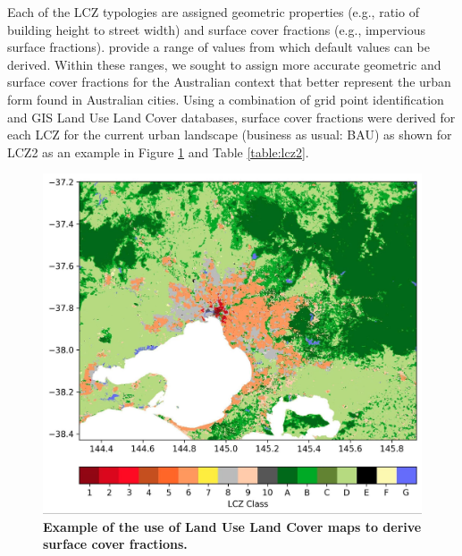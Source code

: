 \documentclass[utf8]{frontiersSCNS} %
\begin{document}
Each of the LCZ typologies are assigned geometric properties (e.g., ratio of building height to street width) and surface cover fractions (e.g., impervious surface fractions). \cite{Stewart2012b} provide a range of values from which default values can be derived. Within these ranges, we sought to assign more accurate geometric and surface cover fractions for the Australian context that better represent the urban form found in Australian cities. Using a combination of grid point identification and GIS Land Use Land Cover databases, surface cover fractions were derived for each LCZ for the current urban landscape (business as usual: BAU) as shown for LCZ2 as an example in Figure \ref{fig:surfCovFrac} and Table \ref{table:lcz2}.

\begin{figure}
\centering
\includegraphics[trim={0 0 0 0},clip,scale=0.15]{images/image5.jpg}
\caption{\bf Example of the use of Land Use Land Cover maps to derive surface cover fractions.}
 \label{fig:surfCovFrac}
\end{figure}
\end{document}
